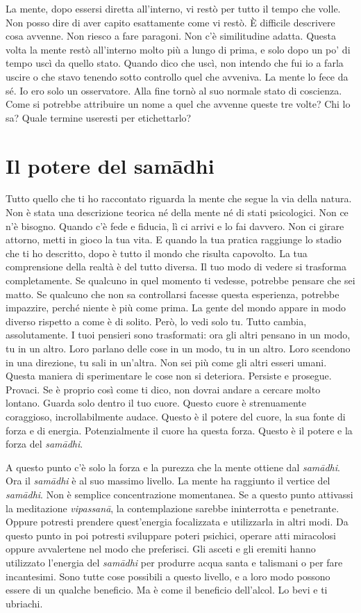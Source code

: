 La mente, dopo essersi diretta all'interno, vi restò per tutto il tempo
che volle. Non posso dire di aver capito esattamente come vi restò. È
difficile descrivere cosa avvenne. Non riesco a fare paragoni. Non c'è
similitudine adatta. Questa volta la mente restò all'interno molto più a
lungo di prima, e solo dopo un po' di tempo uscì da quello stato. Quando
dico che uscì, non intendo che fui io a farla uscire o che stavo tenendo
sotto controllo quel che avveniva. La mente lo fece da sé. Io ero solo
un osservatore. Alla fine tornò al suo normale stato di coscienza. Come
si potrebbe attribuire un nome a quel che avvenne queste tre volte? Chi
lo sa? Quale termine useresti per etichettarlo?

\section{Il potere del samādhi}

Tutto quello che ti ho raccontato riguarda la mente che segue la via
della natura. Non è stata una descrizione teorica né della mente né di
stati psicologici. Non ce n'è bisogno. Quando c'è fede e fiducia, lì ci
arrivi e lo fai davvero. Non ci girare attorno, metti in gioco la tua
vita. E quando la tua pratica raggiunge lo stadio che ti ho descritto,
dopo è tutto il mondo che risulta capovolto. La tua comprensione della
realtà è del tutto diversa. Il tuo modo di vedere si trasforma
completamente. Se qualcuno in quel momento ti vedesse, potrebbe pensare
che sei matto. Se qualcuno che non sa controllarsi facesse questa
esperienza, potrebbe impazzire, perché niente è più come prima. La gente
del mondo appare in modo diverso rispetto a come è di solito. Però, lo
vedi solo tu. Tutto cambia, assolutamente. I tuoi pensieri sono
trasformati: ora gli altri pensano in un modo, tu in un altro. Loro
parlano delle cose in un modo, tu in un altro. Loro scendono in una
direzione, tu sali in un'altra. Non sei più come gli altri esseri umani.
Questa maniera di sperimentare le cose non si deteriora. Persiste e
prosegue. Provaci. Se è proprio così come ti dico, non dovrai andare a
cercare molto lontano. Guarda solo dentro il tuo cuore. Questo cuore è
strenuamente coraggioso, incrollabilmente audace. Questo è il potere del
cuore, la sua fonte di forza e di energia. Potenzialmente il cuore ha
questa forza. Questo è il potere e la forza del \emph{samādhi}.

A questo punto c'è solo la forza e la purezza che la mente ottiene dal
\emph{samādhi}. Ora il \emph{samādhi} è al suo massimo livello. La mente
ha raggiunto il vertice del \emph{samādhi}. Non è semplice
concentrazione momentanea. Se a questo punto attivassi la meditazione
\emph{vipassanā}, la contemplazione sarebbe ininterrotta e penetrante.
Oppure potresti prendere quest'energia focalizzata e utilizzarla in
altri modi. Da questo punto in poi potresti sviluppare poteri psichici,
operare atti miracolosi oppure avvalertene nel modo che preferisci. Gli
asceti e gli eremiti hanno utilizzato l'energia del \emph{samādhi} per
produrre acqua santa e talismani o per fare incantesimi. Sono tutte cose
possibili a questo livello, e a loro modo possono essere di un qualche
beneficio. Ma è come il beneficio dell'alcol. Lo bevi e ti ubriachi.

